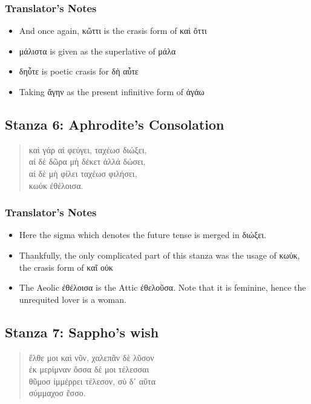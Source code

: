 \subsubsection*{Translator's Notes}
\begin{itemize}
  \item And once again, κὤττι is the crasis form of καὶ ὄττι
  \item μάλιστα is given as the superlative of μάλα
  \item δηὖτε is poetic crasis for δὴ αὖτε
  \item Taking ἄγην as the present infinitive form of ἀγάω
\end{itemize}

\subsection*{Stanza 6: Aphrodite's Consolation}
\begin{quote}
  καὶ γάρ αἰ φεύγει, ταχέωσ διώξει,\\
  αἰ δὲ δῶρα μὴ δέκετ ἀλλά δώσει,\\
  αἰ δὲ μὴ φίλει ταχέωσ φιλήσει,\\
  κωὐκ ἐθέλοισα.
\end{quote}

\subsubsection*{Translator's Notes}
\begin{itemize}
  \item Here the sigma which denotes the future tense is merged in διώξει.
  \item Thankfully, the only complicated part of this stanza was the usage of κωὐκ, the crasis form of καῖ οὐκ
  \item The Aeolic ἐθέλοισα is the Attic ἐθελοῦσα. Note that it is feminine, hence the unrequited lover is a woman.
\end{itemize}

\subsection*{Stanza 7: Sappho's wish}
\begin{quote}
  ἔλθε μοι καὶ νῦν, χαλεπᾶν δὲ λῦσον\\
  ἐκ μερίμναν ὄσσα δέ μοι τέλεσσαι\\
  θῦμοσ ἰμμέρρει τέλεσον, σὐ δ᾽ αὔτα\\
  σύμμαχοσ ἔσσο.
\end{quote}

